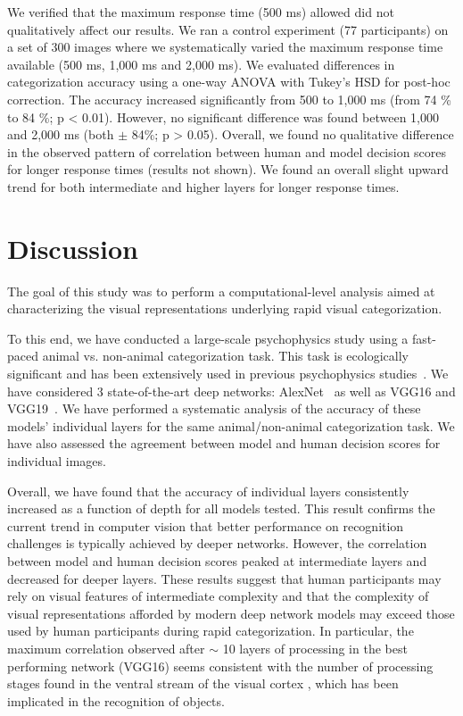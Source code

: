 \documentclass{article}
\begin{document}
We verified that the maximum response time (500 ms) allowed did not qualitatively affect our results. We  ran a  control experiment (77 participants) on a set of 300 images where we systematically varied the maximum response time available (500 ms, 1,000 ms and 2,000 ms). We evaluated differences in categorization accuracy using a one-way ANOVA with Tukey's HSD for post-hoc correction. The accuracy increased significantly from 500 to 1,000 ms (from 74 \% to 84 \%; p < 0.01). However, no significant difference was found between 1,000 and 2,000 ms (both $\pm$ 84\%; p > 0.05). Overall, we found no qualitative difference in the observed pattern of correlation between human and model decision scores for longer response times (results not shown). We found an overall slight upward trend for both intermediate and higher layers for longer response times.

\enlargethispage{5mm}

\section{Discussion}

The goal of this study was to perform a computational-level analysis aimed at characterizing the visual representations underlying rapid visual categorization. 

To this end, we have conducted a large-scale psychophysics study using a fast-paced animal vs. non-animal categorization task. This task is ecologically significant and has been extensively used in previous psychophysics studies~\citep[reviewed in][]{Fabre-Thorpe2011}. We have considered 3 state-of-the-art deep networks: AlexNet~\citep{Krizhevsky2012} as well as VGG16 and VGG19~\citep{Simonyan2014a}. We have performed a systematic analysis of the accuracy of these models' individual layers for the same animal/non-animal categorization task. We have also assessed the agreement between model and human decision scores for individual images. 

Overall, we have found that the accuracy of individual layers consistently increased as a function of depth for all models tested. This result confirms the current trend in computer vision that better performance on recognition challenges is typically achieved by deeper networks. However, the correlation between model and human decision scores peaked at intermediate layers and decreased for deeper layers. These results suggest that human participants may rely on visual features of intermediate complexity and that the complexity of visual representations afforded by modern deep network models may exceed those used by human participants during rapid categorization. In particular, the maximum correlation observed after $\sim$ 10 layers of processing in the best performing network (VGG16) seems consistent with the number of processing stages found in the ventral stream of the visual cortex \cite{Serre2007}, which has been implicated in the recognition of objects. 
\end{document}
